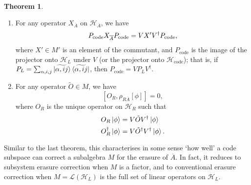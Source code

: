 \documentclass[12pt,a4paper]{report}
\numberwithin{equation}{section}
\newcommand{\ketbra}[2]{\ket{#1}\bra{#2}}
\newcommand{\ketbras}[1]{\ketbra{#1}{#1}}
\newcommand{\Pc}{P_{\text{code}}}
\newcommand{\Hcode}{\mathcal{H}_{\text{code}}}
\newcommand{\ol}[1]{\overline{#1}}
\theoremstyle{definition}
\theoremstyle{theorem}
\newtheorem{theorem}{Theorem}[section]
\theoremstyle{theorem}
\theoremstyle{example}
\theoremstyle{definition}
\begin{document}
\begin{theorem}
\begin{enumerate}
		\item \label{o3} For any operator $X_{\ol{A}}$ on $\mathcal{H}_{\ol{A}}$, we have
		\begin{equation}\label{O3}
			\Pc\Xabar\Pc=VX'V^{\dagger}\Pc,
		\end{equation}
		where $X'\in M'$ is an element of the commutant, and $\Pc$ is the image of the projector onto $\mathcal{H}_{L}$ under $V$ (or the projector onto $\Hcode$); that is, if $P_{L}=\sum_{\alpha,i,j}\ketbras{\widetilde{\alpha,ij}}$, then $\Pc=VP_{L}V^{\dagger}$.
		\item \label{o4} For any operator $\tilde{O}\in M$, we have
		\begin{equation}\label{O4}
			[O_{R},\rho_{R\ol{A}}[\phi]]=0,
		\end{equation}
		where $O_{R}$ is the unique operator on $\mathcal{H}_{R}$ such that
		\begin{equation}\label{O5}
			\begin{aligned}
				O_{R}\ket{\phi}&=V\tilde{O}V^{\dagger}\ket{\phi}\\
				O_{R}^{\dagger}\ket{\phi}&=V\tilde{O}^{\dagger}V^{\dagger}\ket{\phi}.
			\end{aligned}
		\end{equation}
	\end{enumerate}
\end{theorem}
Similar to the last theorem, this characterises in some sense `how well' a code subspace can correct a subalgebra $M$ for the erasure of $\ol{A}$. In fact, it reduces to subsystem erasure correction when $M$ is a factor, and to conventional erasure correction when $M=\mathcal{L}(\mathcal{H}_{L})$ is the full set of linear operators on $\mathcal{H}_{L}$.
\end{document}
